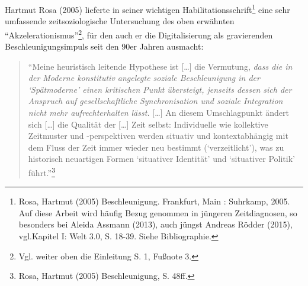 \documentclass[a4paper,
fontsize=11pt,
oneside,
numbers=noperiodatend,
parskip=half-,
bibliography=totoc,
final
]{scrartcl}
\begin{document}
Hartmut Rosa (2005) lieferte in seiner wichtigen
Habilitationsschrift\footnote{Rosa, Hartmut (2005) Beschleunigung.
  Frankfurt, Main : Suhrkamp, 2005. Auf diese Arbeit wird häufig Bezug
  genommen in jüngeren Zeitdiagnosen, so besonders bei Aleida Assmann
  (2013), auch jüngst Andreas Rödder (2015), vgl.Kapitel I: Welt 3.0, S.
  18-39. Siehe Bibliographie.} eine sehr umfassende zeitsoziologische
Untersuchung des oben erwähnten \enquote{Akzelerationismus}\footnote{Vgl.
  weiter oben die Einleitung S. 1, Fußnote 3.}, für den auch er die
Digitalisierung als gravierenden Beschleunigungsimpuls seit den 90er
Jahren ausmacht:

\begin{quote}
\enquote{Meine heuristisch leitende Hypothese ist {[}\ldots{}{]} die
Vermutung, \emph{dass die in der Moderne konstitutiv angelegte soziale
Beschleunigung in der \enquote{Spätmoderne} einen kritischen Punkt
übersteigt, jenseits dessen sich der Anspruch auf gesellschaftliche
Synchronisation und soziale Integration nicht mehr aufrechterhalten
lässt.} {[}\ldots{}{]} An diesem Umschlagpunkt ändert sich
{[}\ldots{}{]} die Qualität der {[}\ldots{}{]} Zeit selbst: Individuelle
wie kollektive Zeitmuster und -perspektiven werden situativ und
kontextabhängig mit dem Fluss der Zeit immer wieder neu bestimmt
(\enquote{verzeitlicht}), was zu historisch neuartigen Formen
\enquote{situativer Identität} und \enquote{situativer Politik}
führt.}\footnote{Rosa, Hartmut (2005) Beschleunigung, S. 48ff.}
\end{quote}
\end{document}
